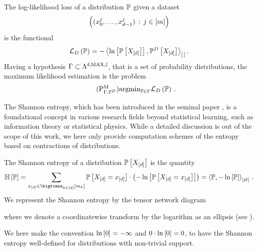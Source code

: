 \begin{definition}
    \label{def:loss}
    The log-likelihood loss of a distribution $\mathbb{P}$ given a dataset
    \begin{align*}
        \left(({x_{0}^{j},\ldots,x_{d-1}^{j}})\,:\,j\in[m]\right)
    \end{align*}
    is the functional
    \begin{align*}
        \mathcal{L}_{D}\left(\mathbb{P}\right)
        = -\left\langle \ln \left[ \mathbb{P}\left[X_{[d]}\right] \right],\mathbb{P}^{D}\left[X_{[d]}\right]\right\rangle_{\left[ \, \right]} .
    \end{align*}
    Having a hypothesis $\Gamma\subset\Lambda^{\delta,\mathrm{MAX},\mathbb{I}}$, that is a set of probability distributions, the maximum likelihood estimation is the problem
    \begin{align}
        \label{prob:parameterMaxLikelihood}\tag{$\probtagtypeinst{\mprojectionsymbol}{\probtensorset,\empdistribution}$}
        \argmin_{\probtensorin} \lossof{\probtensor} \, .
    \end{align}
\end{definition}



The Shannon entropy, which has been introduced in the seminal paper \cite{shannon_mathematical_1948}, is a foundational concept in various research fields beyond statistical learning, such as information theory or statistical physics.
While a detailed discussion is out of the scope of this work, we here only provide computation schemes of the entropy based on contractions of distributions.

\begin{definition}
    The Shannon entropy of a distribution $\mathbb{P}\left[X_{[d]}\right]$ is the quantity
    \begin{align*}
        \sentropyof{\probtensor}
        =  \sum_{\shortcatindicesin} \probat{\indexedshortcatvariables} \cdot \left(-\lnof{\probat{\indexedshortcatvariables}}\right)
        = \contraction{\probtensor,-\lnof{\probtensor}} \, .
    \end{align*}
    We represent the Shannon entropy by the tensor network diagram
    \begin{center}
        
    \end{center}
    where we denote a coordinatewise transform by the logarithm as an ellipsis (see ).
\end{definition}

We here make the convention $\ln \left[ 0 \right]=-\infty$ and $0\cdot\ln \left[ 0 \right] = 0$, to have the Shannon entropy well-defined for distributions with non-trivial support.

